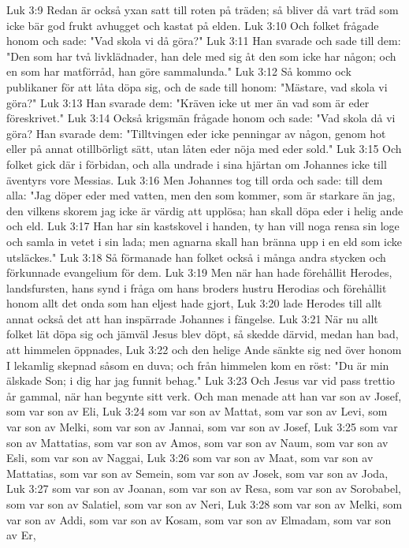 Luk 3:9  Redan är också yxan satt till roten på träden; så bliver då vart träd som icke bär god frukt avhugget och kastat på elden.
Luk 3:10  Och folket frågade honom och sade: "Vad skola vi då göra?"
Luk 3:11  Han svarade och sade till dem: "Den som har två livklädnader, han dele med sig åt den som icke har någon; och en som har matförråd, han göre sammalunda."
Luk 3:12  Så kommo ock publikaner för att låta döpa sig, och de sade till honom: "Mästare, vad skola vi göra?"
Luk 3:13  Han svarade dem: "Kräven icke ut mer än vad som är eder föreskrivet."
Luk 3:14  Också krigsmän frågade honom och sade: "Vad skola då vi göra? Han svarade dem: "Tilltvingen eder icke penningar av någon, genom hot eller på annat otillbörligt sätt, utan låten eder nöja med eder sold."
Luk 3:15  Och folket gick där i förbidan, och alla undrade i sina hjärtan om Johannes icke till äventyrs vore Messias.
Luk 3:16  Men Johannes tog till orda och sade: till dem alla: "Jag döper eder med vatten, men den som kommer, som är starkare än jag, den vilkens skorem jag icke är värdig att upplösa; han skall döpa eder i helig ande och eld.
Luk 3:17  Han har sin kastskovel i handen, ty han vill noga rensa sin loge och samla in vetet i sin lada; men agnarna skall han bränna upp i en eld som icke utsläckes."
Luk 3:18  Så förmanade han folket också i många andra stycken och förkunnade evangelium för dem.
Luk 3:19  Men när han hade förehållit Herodes, landsfursten, hans synd i fråga om hans broders hustru Herodias och förehållit honom allt det onda som han eljest hade gjort,
Luk 3:20  lade Herodes till allt annat också det att han inspärrade Johannes i fängelse.
Luk 3:21  När nu allt folket lät döpa sig och jämväl Jesus blev döpt, så skedde därvid, medan han bad, att himmelen öppnades,
Luk 3:22  och den helige Ande sänkte sig ned över honom I lekamlig skepnad såsom en duva; och från himmelen kom en röst: "Du är min älskade Son; i dig har jag funnit behag."
Luk 3:23  Och Jesus var vid pass trettio år gammal, när han begynte sitt verk. Och man menade att han var son av Josef, som var son av Eli,
Luk 3:24  som var son av Mattat, som var son av Levi, som var son av Melki, som var son av Jannai, som var son av Josef,
Luk 3:25  som var son av Mattatias, som var son av Amos, som var son av Naum, som var son av Esli, som var son av Naggai,
Luk 3:26  som var son av Maat, som var son av Mattatias, som var son av Semein, som var son av Josek, som var son av Joda,
Luk 3:27  som var son av Joanan, som var son av Resa, som var son av Sorobabel, som var son av Salatiel, som var son av Neri,
Luk 3:28  som var son av Melki, som var son av Addi, som var son av Kosam, som var son av Elmadam, som var son av Er,
